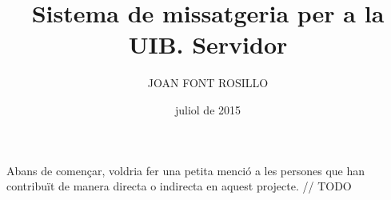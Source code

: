 \documentclass[catalan,GINF]{TFGEPSUIB}
\title{Sistema de missatgeria per a la UIB. Servidor}
\author{\MakeUppercase{Joan Font Rosillo}}
\date{juliol de 2015}
\begin{document}
\portada
\frontmatter

\cleartorecto \thispagestyle{empty}
\begin{agraiments}
Abans de començar, voldria fer una petita menció a les persones que han contribuït de manera directa o indirecta en aquest projecte.\newline
// TODO
\end{agraiments}

\cleartorecto \tableofcontents
\cleartorecto \listoffigures
\cleartorecto \listoftables 

 

 

\mainmatter\pagestyle{ruled}







\appendix 



\backmatter



 
\end{document}
